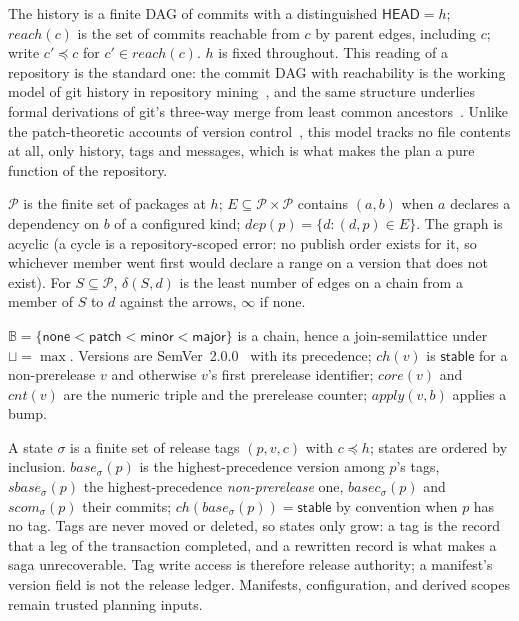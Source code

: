 \documentclass[sigconf,nonacm]{acmart}
\begin{document}
\begin{definition}[history]
The history is a finite DAG of commits with a distinguished
$\mathsf{HEAD} = h$; $\mathit{reach}(c)$ is the set of commits reachable
from $c$ by parent edges, including $c$; write $c' \preceq c$ for
$c' \in \mathit{reach}(c)$. $h$ is fixed throughout. This reading of a
repository is the standard one: the commit DAG with reachability is the
working model of git history in repository mining~\cite{birdgit}, and
the same structure underlies formal derivations of git's three-way
merge from least common ancestors~\cite{mrdt}. Unlike the
patch-theoretic accounts of version
control~\cite{swierstraloh,hpt,mimram}, this model tracks no file
contents at all, only history, tags and messages, which is what
makes the plan a pure function of the repository.
\end{definition}

\begin{definition}[workspace]
$\mathcal{P}$ is the finite set of packages at $h$; $E \subseteq
\mathcal{P} \times \mathcal{P}$ contains $(a,b)$ when $a$ declares a
dependency on $b$ of a configured kind; $\mathit{dep}(p) = \{d : (d,p)
\in E\}$. The graph is acyclic (a cycle is a repository-scoped error: no
publish order exists for it, so whichever member went first would
declare a range on a version that does not exist). For $S \subseteq
\mathcal{P}$, $\delta(S,d)$ is the least number of edges on a chain from
a member of $S$ to $d$ against the arrows, $\infty$ if none.
\end{definition}

\begin{definition}
$\mathbb{B} = \{\mathsf{none} < \mathsf{patch} < \mathsf{minor} <
\mathsf{major}\}$ is a chain, hence a join-semilattice under
$\sqcup = \max$. Versions are SemVer~2.0.0~\cite{semver} with its
precedence; $\mathit{ch}(v)$ is $\mathsf{stable}$ for a non-prerelease
$v$ and otherwise $v$'s first prerelease identifier; $\mathit{core}(v)$
and $\mathit{cnt}(v)$ are the numeric triple and the prerelease counter;
$\mathit{apply}(v,b)$ applies a bump.
\end{definition}

\begin{definition}[state]
\label{def:state}
A state $\sigma$ is a finite set of release tags $(p, v, c)$ with
$c \preceq h$; states are ordered by inclusion. $\mathit{base}_\sigma(p)$
is the highest-precedence version among $p$'s tags,
$\mathit{sbase}_\sigma(p)$ the highest-precedence \emph{non-prerelease}
one, $\mathit{basec}_\sigma(p)$ and $\mathit{scom}_\sigma(p)$ their
commits; $\mathit{ch}(\mathit{base}_\sigma(p)) = \mathsf{stable}$ by
convention when $p$ has no tag. Tags are never moved or deleted, so
states only grow: a tag is the record that a leg of the transaction
completed, and a rewritten record is what makes a saga unrecoverable.
Tag write access is therefore release authority; a manifest's version field
is not the release ledger. Manifests, configuration, and derived scopes remain
trusted planning inputs.
\end{definition}
\end{document}
